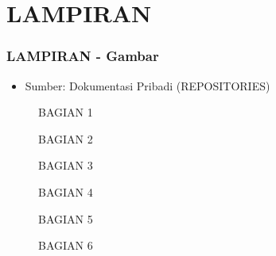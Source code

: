 \documentclass{beamer}
\begin{document}
\section{LAMPIRAN}
\begin{frame}
    \frametitle{LAMPIRAN - Gambar}
    \centering
\begin{itemize}
    \item Sumber: Dokumentasi Pribadi (REPOSITORIES)
\end{itemize}
\begin{figure}
    \centering

    \begin{enumerate}
    \end{enumerate}
    
    \caption{BAGIAN 1}
    \label{fig:enter-label}
\end{figure}
\end{frame}
\begin{frame}
\begin{figure}
    \centering
    \caption{BAGIAN 2}
    \label{fig:enter-label}
\end{figure}
\end{frame}
\begin{frame}
\begin{figure}
    \centering

    \caption{BAGIAN 3}
    \label{fig:enter-label}
\end{figure}
\end{frame}
\begin{frame}
    
\begin{figure}
    \centering
    \caption{BAGIAN 4}
    \label{fig:enter-label}
\end{figure}
\end{frame}
\begin{frame}
    
\begin{figure}
    \centering
    \caption{BAGIAN 5}
    \label{fig:enter-label}
\end{figure}
\end{frame}
\begin{frame}
    
\begin{figure}
    \centering
    \caption{BAGIAN 6}
    \label{fig:enter-label}
\end{figure}
\end{frame}
\end{document}
